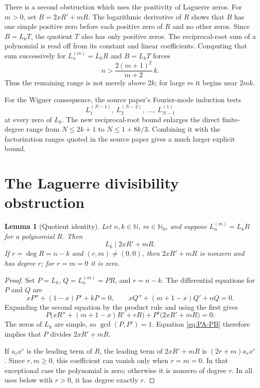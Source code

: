 \documentclass[11pt]{article}
\newtheorem{lemma}[theorem]{Lemma}
\theoremstyle{remark}
\newcommand{\Lag}[2]{L_{#1}^{(#2)}}
\begin{document}
There is a second obstruction which uses the positivity of Laguerre zeros.
For $m>0$, set $B=2xR'+mR$.  The logarithmic derivative of $R$ shows that
$B$ has one simple positive zero before each positive zero of $R$ and no
other zeros.  Since $B=L_kT$, the quotient $T$ also has only positive zeros.
The reciprocal-root sum of a polynomial is read off from its constant and
linear coefficients.  Computing that sum successively for
$L_n^{(m)}=L_kR$ and $B=L_kT$ forces
\[
          n>\frac{2(m+1)^2}{m+2}\,k.
\]
Thus the remaining range is not merely above $2k$; for large $m$ it begins
near $2mk$.

For the Wigner consequence, the source paper's Fourier-mode induction tests
\[
       L_1^{(N-1)},\ L_2^{(N-2)},\ \ldots,\ L_{N-1}^{(1)}
\]
at every zero of $L_k$.
The new reciprocal-root bound enlarges the direct finite-degree range from
$N\leq2k+1$ to $N\leq1+8k/3$.  Combining it with the factorization ranges
quoted in the source paper gives a much larger explicit bound.

\section{The Laguerre divisibility obstruction}

\begin{lemma}[Quotient identity]\label{lem:quotient}
Let $n,k\in\mathbb N$, $m\in\mathbb N_0$, and suppose
$\Lag{n}{m}=L_kR$ for a polynomial $R$.  Then
\begin{equation}\label{eq:weighted-div}
       L_k\mid 2xR'+mR.
\end{equation}
If $r=\deg R=n-k$ and $(r,m)\neq(0,0)$, then $2xR'+mR$ is
nonzero and has degree $r$; for $r=m=0$ it is zero.
\end{lemma}

\begin{proof}
Set $P=L_k$, $Q=\Lag{n}{m}=PR$, and $r=n-k$.  The differential
equations for $P$ and $Q$ are
\[
 xP''+(1-x)P'+kP=0,
 \qquad
 xQ''+(m+1-x)Q'+nQ=0.
\]
Expanding the second equation by the product rule and using the first gives
\begin{equation}\label{eq:PA-PB}
 P\bigl(xR''+(m+1-x)R'+rR\bigr)
 +P'\bigl(2xR'+mR\bigr)=0.
\end{equation}
The zeros of $L_k$ are simple, so $\gcd(P,P')=1$.  Equation
\eqref{eq:PA-PB} therefore implies that $P$ divides $2xR'+mR$.

If $a_rx^r$ is the leading term of $R$, the leading term of
$2xR'+mR$ is $(2r+m)a_rx^r$.  Since $r,m\geq0$, this coefficient
can vanish only when $r=m=0$.  In that exceptional case the polynomial is
zero; otherwise it is nonzero of degree $r$.  In all uses below with
$r>0$, it has degree exactly $r$.
\end{proof}
\end{document}
